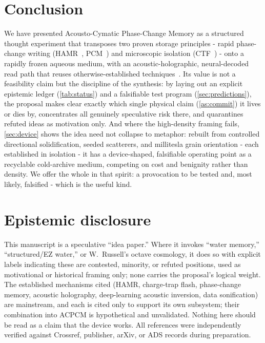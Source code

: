 \documentclass[11pt]{article}
\theoremstyle{definition}
\begin{document}
\section{Conclusion}
\label{sec:conclusion}

We have presented Acousto-Cymatic Phase-Change Memory as a structured thought experiment that
transposes two proven storage principles - rapid phase-change writing
(HAMR~\cite{kryder2008hamr}, PCM~\cite{wuttig2007pcm}) and microscopic isolation
(CTF~\cite{white2000sonos}) - onto a rapidly frozen aqueous medium, with an
acoustic-holographic, neural-decoded read path that reuses otherwise-established
techniques~\cite{melde2016holograms,lin2021dlholograms}. Its value is not a feasibility
claim but the discipline of the synthesis: by laying out an explicit epistemic ledger
(\cref{tab:status}) and a falsifiable test program (\cref{sec:predictions}), the proposal
makes clear exactly which single physical claim (\cref{as:commit}) it lives or dies by,
concentrates all genuinely speculative risk there, and quarantines refuted ideas as
motivation only. And where the high-density framing fails, \cref{sec:device} shows the idea
need not collapse to metaphor: rebuilt from controlled directional solidification, seeded
scatterers, and millitesla grain orientation - each established in isolation - it has a
device-shaped, falsifiable operating point as a recyclable cold-archive medium, competing on
cost and benignity rather than density. We offer the whole in that spirit: a provocation to be
tested and, most likely, falsified - which is the useful kind.

\section*{Epistemic disclosure}
\small
This manuscript is a speculative ``idea paper.'' Where it invokes ``water memory,''
``structured/EZ water,'' or W.~Russell's octave cosmology, it does so with explicit labels
indicating these are contested, minority, or refuted positions, used as motivational or
historical framing only; none carries the proposal's logical weight. The established
mechanisms cited (HAMR, charge-trap flash, phase-change memory, acoustic holography,
deep-learning acoustic inversion, data sonification) are mainstream, and each is cited only
to support its own subsystem; their combination into ACPCM is hypothetical and unvalidated.
Nothing here should be read as a claim that the device works. All references were
independently verified against Crossref, publisher, arXiv, or ADS records during
preparation.
\end{document}
